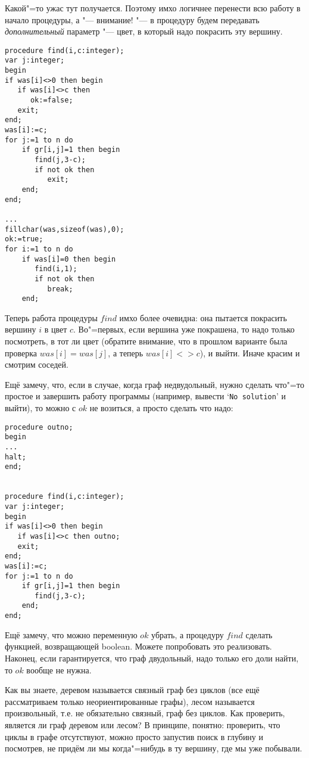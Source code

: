 Какой"=то ужас тут получается. Поэтому имхо логичнее перенести всю работу в начало процедуры, а 
"--- внимание! "--- в процедуру будем передавать \textit{дополнительный} параметр "--- цвет, в 
который надо покрасить эту вершину.
\begin{codesample}
\begin{verbatim}
procedure find(i,c:integer);
var j:integer;
begin
if was[i]<>0 then begin
   if was[i]<>c then
      ok:=false;
   exit;
end;
was[i]:=c;
for j:=1 to n do
    if gr[i,j]=1 then begin
       find(j,3-c);
       if not ok then
          exit;
    end;
end;

...
fillchar(was,sizeof(was),0);
ok:=true;
for i:=1 to n do
    if was[i]=0 then begin
       find(i,1);
       if not ok then
          break;
    end;
\end{verbatim}
\end{codesample}

Теперь работа процедуры $find$ имхо более очевидна: она пытается покрасить вершину $i$ в цвет $c$. 
Во"=первых, если вершина уже покрашена, то надо только посмотреть, в тот ли цвет (обратите 
внимание, что в прошлом варианте была проверка $was[i]=was[j]$, а теперь $was[i]<>c$), и выйти. 
Иначе красим и смотрим соседей.

Ещё замечу, что, если в случае, когда граф недвудольный, нужно сделать что"=то простое и завершить 
работу программы (например, вывести `\texttt{No solution}' и выйти), то можно с $ok$ не возиться, а 
просто сделать что надо:
\begin{codesample}
\begin{verbatim}
procedure outno;
begin
...
halt;
end;


procedure find(i,c:integer);
var j:integer;
begin
if was[i]<>0 then begin
   if was[i]<>c then outno;
   exit;
end;
was[i]:=c;
for j:=1 to n do
    if gr[i,j]=1 then begin
       find(j,3-c);
    end;
end;
\end{verbatim}
\end{codesample}

Ещё замечу, что можно переменную $ok$ убрать, а процедуру $find$ сделать функцией, возвращающей boolean. Можете 
попробовать это реализовать. Наконец, если гарантируется, что граф двудольный, надо только его доли 
найти, то $ok$ вообще не нужна.


Как вы знаете, деревом называется связный граф без циклов (все ещё рассматриваем только 
неориентированные графы), лесом называется произвольный, т.е. не обязательно связный, граф без 
циклов. Как проверить, является ли граф деревом или лесом? В принципе, понятно: проверить, что 
циклы в графе отсутствуют, можно просто запустив поиск в глубину и посмотрев, не придём ли мы 
когда"=нибудь в ту вершину, где мы уже побывали.


